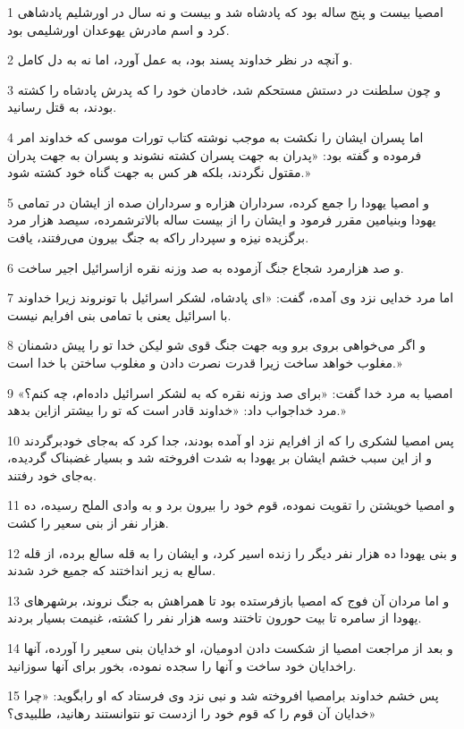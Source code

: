 \par 1 امصیا بیست و پنج ساله بود که پادشاه شد و بیست و نه سال در اورشلیم پادشاهی کرد و اسم مادرش یهوعدان اورشلیمی بود.
\par 2 و آنچه در نظر خداوند پسند بود، به عمل آورد، اما نه به دل کامل.
\par 3 و چون سلطنت در دستش مستحکم شد، خادمان خود را که پدرش پادشاه را کشته بودند، به قتل رسانید.
\par 4 اما پسران ایشان را نکشت به موجب نوشته کتاب تورات موسی که خداوند امر فرموده و گفته بود: «پدران به جهت پسران کشته نشوند و پسران به جهت پدران مقتول نگردند، بلکه هر کس به جهت گناه خود کشته شود.»
\par 5 و امصیا یهودا را جمع کرده، سرداران هزاره و سرداران صده از ایشان در تمامی یهودا وبنیامین مقرر فرمود و ایشان را از بیست ساله بالاترشمرده، سیصد هزار مرد برگزیده نیزه و سپردار راکه به جنگ بیرون می‌رفتند، یافت.
\par 6 و صد هزارمرد شجاع جنگ آزموده به صد وزنه نقره ازاسرائیل اجیر ساخت.
\par 7 اما مرد خدایی نزد وی آمده، گفت: «ای پادشاه، لشکر اسرائیل با تونروند زیرا خداوند با اسرائیل یعنی با تمامی بنی افرایم نیست.
\par 8 و اگر می‌خواهی بروی برو وبه جهت جنگ قوی شو لیکن خدا تو را پیش دشمنان مغلوب خواهد ساخت زیرا قدرت نصرت دادن و مغلوب ساختن با خدا است.»
\par 9 امصیا به مرد خدا گفت: «برای صد وزنه نقره که به لشکر اسرائیل داده‌ام، چه کنم؟» مرد خداجواب داد: «خداوند قادر است که تو را بیشتر ازاین بدهد.»
\par 10 پس امصیا لشکری را که از افرایم نزد او آمده بودند، جدا کرد که به‌جای خودبرگردند و از این سبب خشم ایشان بر یهودا به شدت افروخته شد و بسیار غضبناک گردیده، به‌جای خود رفتند.
\par 11 و امصیا خویشتن را تقویت نموده، قوم خود را بیرون برد و به وادی الملح رسیده، ده هزار نفر از بنی سعیر را کشت.
\par 12 و بنی یهودا ده هزار نفر دیگر را زنده اسیر کرد، و ایشان را به قله سالع برده، از قله سالع به زیر انداختند که جمیع خرد شدند.
\par 13 و اما مردان آن فوج که امصیا بازفرستده بود تا همراهش به جنگ نروند، برشهرهای یهودا از سامره تا بیت حورون تاختند وسه هزار نفر را کشته، غنیمت بسیار بردند.
\par 14 و بعد از مراجعت امصیا از شکست دادن ادومیان، او خدایان بنی سعیر را آورده، آنها راخدایان خود ساخت و آنها را سجده نموده، بخور برای آنها سوزانید.
\par 15 پس خشم خداوند برامصیا افروخته شد و نبی نزد وی فرستاد که او رابگوید: «چرا خدایان آن قوم را که قوم خود را ازدست تو نتوانستند رهانید، طلبیدی؟»
